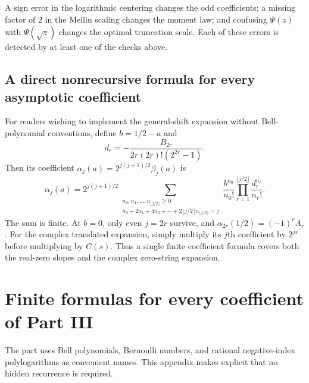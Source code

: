 \documentclass[11pt,a4paper,oneside,openany]{book}
\numberwithin{equation}{chapter}
\theoremstyle{definition}
\theoremstyle{remark}
\begin{document}
A sign error in the logarithmic centering changes the odd
coefficients; a missing factor of $2$ in the Mellin scaling changes
the moment law; and confusing $\Psi(z)$ with $\Psi(\sqrt z)$ changes
the optimal truncation scale. Each of these errors is detected by
at least one of the checks above.

\section{A direct nonrecursive formula for every asymptotic coefficient}
\label{dc:app:alpha}

For readers wishing to implement the general-shift expansion without
Bell-polynomial conventions, define $b=1/2-a$ and
\[
 d_r=-\frac{B_{2r}}{2r(2r)!(2^{2r}-1)}.
\]
Then its coefficient $\alpha_j(a)=2^{j(j+1)/2}\beta_j(a)$ is
\begin{equation}
 \boxed{\displaystyle
 \alpha_j(a)=2^{j(j+1)/2}
 \sum_{\substack{n_0,n_1,\ldots,n_{\lfloor j/2\rfloor}\ge0\\
 n_0+2n_1+4n_2+\cdots+2\lfloor j/2\rfloor n_{\lfloor j/2\rfloor}=j}}
 \frac{b^{n_0}}{n_0!}
 \prod_{r=1}^{\lfloor j/2\rfloor}\frac{d_r^{n_r}}{n_r!}.}
 \label{dc:eq:alpha-final}
\end{equation}
The sum is finite. At $b=0$, only even $j=2r$ survive, and
$\alpha_{2r}(1/2)=(-1)^rA_r$. For the complex translated expansion,
simply multiply its $j$th coefficient by $2^{js}$ before multiplying
by $C(s)$. Thus a single finite coefficient formula covers both the
real-zero slopes and the complex zero-string expansion.
\chapter{Finite formulas for every coefficient of Part III}
\label{rr:app:finite}

The part uses Bell polynomials, Bernoulli numbers, and rational negative-index polylogarithms as convenient names. This appendix makes explicit that no hidden recurrence is required.
\end{document}
